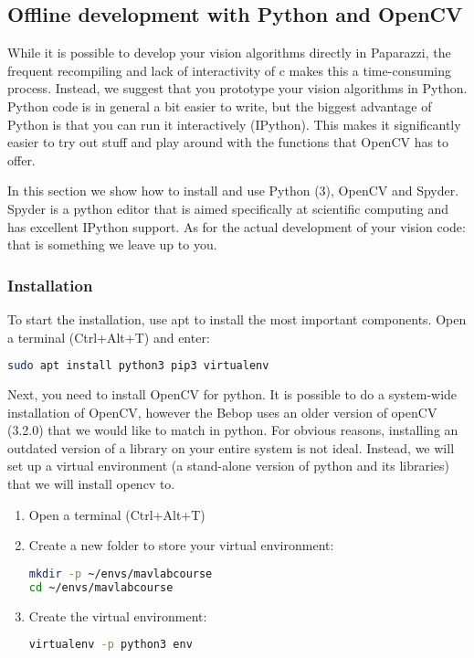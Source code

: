 \documentclass{article}
\begin{document}
\subsection{Offline development with Python and OpenCV}
While it is possible to develop your vision algorithms directly in Paparazzi, the frequent recompiling and lack of interactivity of c makes this a time-consuming process.
Instead, we suggest that you prototype your vision algorithms in Python. Python code is in general a bit easier to write, but the biggest advantage of Python is that you can run it interactively (IPython). This makes it significantly easier to try out stuff and play around with the functions that OpenCV has to offer.

In this section we show how to install and use Python (3), OpenCV and Spyder. Spyder is a python editor that is aimed specifically at scientific computing and has excellent IPython support. As for the actual development of your vision code: that is something we leave up to you.

\subsubsection{Installation}
To start the installation, use apt to install the most important components. Open a terminal (Ctrl+Alt+T) and enter:
\begin{lstlisting}[language=bash]
sudo apt install python3 pip3 virtualenv
\end{lstlisting}

Next, you need to install OpenCV for python. It is possible to do a system-wide installation of OpenCV, however the Bebop uses an older version of openCV (3.2.0) that we would like to match in python. For obvious reasons, installing an outdated version of a library on your entire system is not ideal. Instead, we will set up a virtual environment (a stand-alone version of python and its libraries) that we will install opencv to.
\begin{enumerate}
\item Open a terminal (Ctrl+Alt+T)
\item Create a new folder to store your virtual environment:
\begin{lstlisting}[language=bash]
mkdir -p ~/envs/mavlabcourse
cd ~/envs/mavlabcourse
\end{lstlisting}
\item Create the virtual environment:
\begin{lstlisting}[language=bash]
virtualenv -p python3 env
\end{lstlisting}
\end{enumerate}
\end{document}
